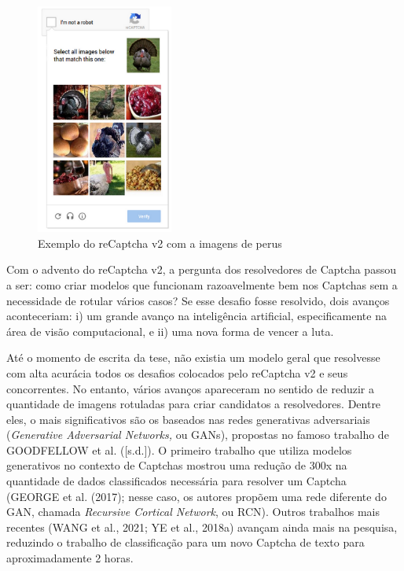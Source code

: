\documentclass[12pt,twoside,brazilian]{book}
\begin{document}
\begin{figure}

{\centering \includegraphics[width=0.4\textwidth,height=\textheight]{./assets/img/turkey.png}

}

\caption{\label{fig-turkey}Exemplo do reCaptcha v2 com a imagens de
perus}

\end{figure}

Com o advento do reCaptcha v2, a pergunta dos resolvedores de Captcha
passou a ser: como criar modelos que funcionam razoavelmente bem nos
Captchas sem a necessidade de rotular vários casos? Se esse desafio
fosse resolvido, dois avanços aconteceriam: i) um grande avanço na
inteligência artificial, especificamente na área de visão computacional,
e ii) uma nova forma de vencer a luta.

Até o momento de escrita da tese, não existia um modelo geral que
resolvesse com alta acurácia todos os desafios colocados pelo reCaptcha
v2 e seus concorrentes. No entanto, vários avanços apareceram no sentido
de reduzir a quantidade de imagens rotuladas para criar candidatos a
resolvedores. Dentre eles, o mais significativos são os baseados nas
redes generativas adversariais (\emph{Generative Adversarial Networks,}
ou GANs), propostas no famoso trabalho de GOODFELLOW et al.
({[}s.d.{]}). O primeiro trabalho que utiliza modelos generativos no
contexto de Captchas mostrou uma redução de 300x na quantidade de dados
classificados necessária para resolver um Captcha (GEORGE et al. (2017);
nesse caso, os autores propõem uma rede diferente do GAN, chamada
\emph{Recursive Cortical Network}, ou RCN). Outros trabalhos mais
recentes (WANG et al., 2021; YE et al., 2018a) avançam ainda mais na
pesquisa, reduzindo o trabalho de classificação para um novo Captcha de
texto para aproximadamente 2 horas.
\end{document}
